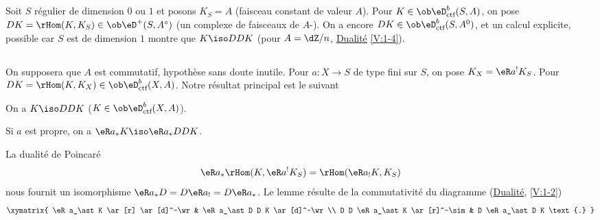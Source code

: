 \subsection{}\label{VII:4-1}

Soit $S$ régulier de dimension $0$ ou $1$ et posons $K_S=A$ (faisceau 
constant de valeur $A$). Pour $K\in\ob\eD_\text{ctf}^b(S,A)$, on pose 
$D K=\rHom(K,K_S)\in\ob\eD^+(S,A^\circ)$ (un complexe de faisceaux de 
$A$-). On a encore $D K\in\ob\eD_\text{ctf}^b(S,A^0)$, et 
un calcul explicite, possible car $S$ est de dimension $1$ montre que 
$K\iso D D K$ (pour $A=\dZ/n$, \hyperref[V]{Dualité} \ref{V:1-4}). 





\subsection{}\label{VII:4-2}

On supposera que $A$ est commutatif, hypothèse sans doute inutile. Pour 
$a:X\to S$ de type fini sur $S$, on pose $K_X=\eR a^! K_S$. Pour 
$D K=\rHom(K,K_X)\in\ob\eD_\text{ctf}^b(X,A)$. Notre résultat principal est 
le suivant 





\begin{theorem_}\label{VII:4-3}
On a $K\iso D D K$ ($K\in \ob\eD_\textnormal{ctf}^b(X,A)$). 
\end{theorem_}





\begin{lemma_}\label{VII:4-4}
Si $a$ est propre, on a $\eR a_\ast K \iso \eR a_\ast D D K$. 
\end{lemma_}

La dualité de Poincaré 
\[
  \eR a_\ast \rHom(K,\eR a^! K_S) = \rHom(\eR a_! K,K_S) 
\]
nous fournit un isomorphisme $\eR a_\ast D = D \eR a_! = D \eR a_\ast$. Le 
lemme résulte de la commutativité du diagramme (\hyperref[V]{Dualité}, 
\ref{V:1-2}) 
\[\xymatrix{
  \eR a_\ast K \ar[r] \ar[d]^-\wr 
    & \eR a_\ast D D K \ar[d]^-\wr \\
  D D \eR a_\ast K \ar[r]^-\sim 
    & D \eR a_\ast D K \text{.} 
}\]





